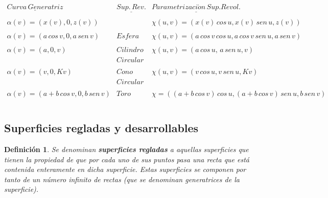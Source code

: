 \documentclass[twoside]{article}
\newtheorem{defi}[theorem]{Definición}
\numberwithin{equation}{section}
\begin{document}
$$
\begin{array}{lll}
{\underline {Curva \, Generatriz}} & {\underline {Sup. \, Rev.}} &
{\underline {Parametrizaci\acute on \, Sup. Revol.}}  \\

   &   &   \\

	\alpha(v) = (x(v), 0, z(v)) &  & \chi(u,v) =
(x(v) \, cos \, u, x(v)\,  sen\, u, z(v))  \\

    &   &    \\

\alpha(v) = (a \, cos\, v, 0, a \, sen\, v) & Esfera & \chi(u,v) =
(a\,  cos\, v \, cos\, u, a \, cos\, v \, sen\, u, a \, sen\, v)  \\

  &  &  \\

\alpha(v) = (a, 0, v) & Cilindro  & \chi(u,v) =
(a \, cos\, u, \, a \, sen\, u, v)  \\
  & Circular &  \\
  &  &  \\

\alpha(v) = (v, 0, Kv) & Cono & \chi(u,v) =
(v\,  cos\, u, v \, sen\, u, Kv)  \\
  & Circular &  \\
 & & \\

\alpha(v) = (a + b \, cos\, v, 0, b \, sen\, v) & Toro & \chi =
((a + b \, cos\, v)\,  cos\, u, (a + b\,  cos\, v)\,  sen\, u, b \, sen\, v)  \\

  &  &  \\
\end{array}$$
\subsection{Superficies regladas y desarrollables}

\begin{defi} Se denominan
{\bf superficies
regladas} a aquellas superficies que tienen la pro\-piedad
de que por cada uno de sus puntos pasa una recta que est\'a contenida
enteramente en dicha superficie. Estas superficies se componen por tanto
de un n\'umero infinito de rectas (que se denominan {\em generatrices} de la
superficie).
\end{defi}
\end{document}
